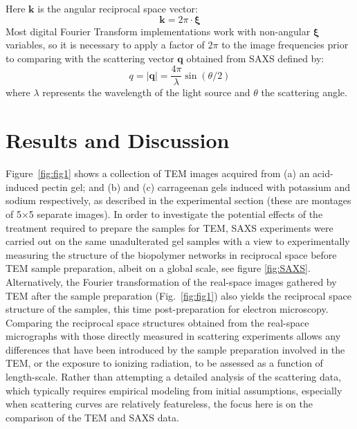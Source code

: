 \noindent Here $\bm{k}$ is the angular reciprocal space vector:
\begin{equation}\label{angular_freq}
  \bm{k} = 2\pi \cdot \bm{\xi}
\end{equation}
Most digital Fourier Transform implementations work with non-angular $\bm{\xi}$ variables, so it is necessary to apply a factor of $2\pi$ to the image frequencies prior to comparing with the scattering vector $\bm{q}$ obtained from SAXS defined by:
\begin{equation}
q = |\bm{q}| = \frac{4\pi}{\lambda}\sin(\theta/2)
\end{equation}where $\lambda$ represents the wavelength of the light source and $\theta$ the scattering angle.


\section{Results and Discussion}
Figure~\ref{fig:fig1} shows a collection of TEM images acquired from (a) an acid-induced pectin gel; and (b) and (c) carrageenan gels induced with potassium and sodium respectively, as described in the experimental section (these are montages of 5$\times$5 separate images). In order to investigate the potential effects of the treatment required to prepare the samples for TEM, SAXS experiments were carried out on the same unadulterated gel samples with a view to experimentally measuring the structure of the biopolymer networks in reciprocal space before TEM sample preparation, albeit on a global scale, see figure \ref{fig:SAXS}. Alternatively, the Fourier transformation of the real-space images gathered by TEM after the sample preparation (Fig.~\ref{fig:fig1}) also yields the reciprocal space structure of the samples, this time post-preparation for electron microscopy. Comparing the reciprocal space structures obtained from the real-space micrographs with those directly measured in scattering experiments allows any differences that have been introduced by the sample preparation involved in the TEM, or the exposure to ionizing radiation, to be assessed as a function of length-scale. Rather than attempting a detailed analysis of the scattering data, which typically requires empirical modeling from initial assumptions, especially when scattering curves are relatively featureless, the focus here is on the comparison of the TEM and SAXS data.

